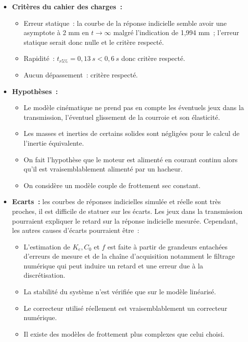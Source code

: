 \begin{corrige}
\begin{itemize}
\item
  \textbf{Critères du cahier des charges~:}

  \begin{itemize}
  \item
    Erreur statique~: la courbe de la réponse indicielle semble avoir
    une asymptote à 2 mm en \(t \rightarrow \infty\) malgré l'indication
    de 1,994 mm~; l'erreur statique serait donc nulle et le critère
    respecté.
  \item
    Rapidité~: \(t_{r5\%} = 0,13\ s < 0,6\ s\) donc critère respecté.
  \item
    Aucun dépassement~: critère respecté.
  \end{itemize}
\item
  \textbf{Hypothèses~:}

  \begin{itemize}
  \item
    Le modèle cinématique ne prend pas en compte les éventuels jeux dans
    la transmission, l'éventuel glissement de la courroie et son
    élasticité.
  \item
    Les masses et inerties de certains solides sont négligées pour le
    calcul de l'inertie équivalente.
  \item
    On fait l'hypothèse que le moteur est alimenté en courant continu
    alors qu'il est vraisemblablement alimenté par un hacheur.
  \item
    On considère un modèle couple de frottement sec constant.
  \end{itemize}
\item
  \textbf{Ecarts~:} les courbes de réponses indicielles simulée et réelle sont
  très proches, il est difficile de statuer sur les écarts. Les jeux
  dans la transmission pourraient expliquer le retard sur la réponse
  indicielle mesurée. Cependant, les autres causes d'écarts pourraient
  être~:

  \begin{itemize}
  \item
    L'estimation de \(K_{e},C_{0}\) et \(f\) est faite à partir de
    grandeurs entachées d'erreurs de mesure et de la chaîne
    d'acquisition notamment le filtrage numérique qui peut induire un
    retard et une erreur due à la discrétisation.
  \item
    La stabilité du système n'est vérifiée que sur le modèle linéarisé.
  \item
    Le correcteur utilisé réellement est vraisemblablement un correcteur
    numérique.
  \item
    Il existe des modèles de frottement plus complexes que celui choisi.
  \end{itemize}
\end{itemize}

\end{corrige}
\else
\fi


